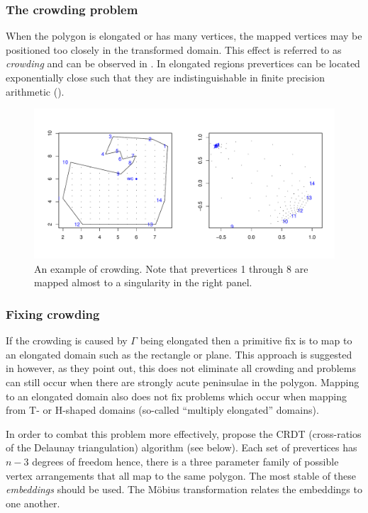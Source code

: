 \subsubsection{The crowding problem}
When the polygon is elongated or has many vertices, the mapped vertices may be positioned too closely in the transformed domain. This effect is referred to as \emph{crowding} and can be observed in . In elongated regions prevertices can be located exponentially close such that they are indistinguishable in finite precision arithmetic (\cite{howell90}).

\begin{figure} [tbp]
\centering
\includegraphics[scale=0.5]{sc/figs/crowdeddisk.pdf}
\caption{An example of crowding. Note that prevertices 1 through 8 are mapped almost to a singularity in the right panel.}
\label{crowdeddisk}
\end{figure}

\subsubsection{Fixing crowding}

If the crowding is caused by $\Gamma$ being elongated then a  primitive fix is to map to an elongated domain such as the rectangle or plane. This approach is suggested in \cite{howell90} however, as they point out, this does not eliminate all crowding and problems can still occur when there are strongly acute peninsulae in the polygon. Mapping to an elongated domain also does not fix problems which occur when mapping from T- or H-shaped domains (so-called ``multiply elongated'' domains).

In order to combat this problem more effectively, \cite{vavasis96} propose the CRDT (cross-ratios of the Delaunay triangulation) algorithm (see below). Each set of prevertices has $n-3$ degrees of freedom hence, there is a three parameter family of possible vertex arrangements that all map to the same polygon. The most stable of these \emph{embeddings} should be used. The M\"{o}bius transformation relates the embeddings to one another.


